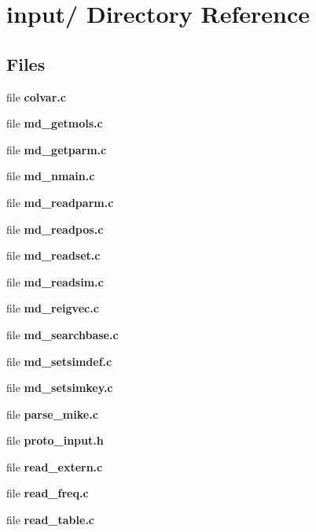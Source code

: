 \section{input/ Directory Reference}
\label{dir_ced1cca01981c350a62d28788f1e9798}
\subsection*{Files}
\begin{CompactItemize}
\item 
file {\bf colvar.c}
\item 
file {\bf md\_\-getmols.c}
\item 
file {\bf md\_\-getparm.c}
\item 
file {\bf md\_\-nmain.c}
\item 
file {\bf md\_\-readparm.c}
\item 
file {\bf md\_\-readpos.c}
\item 
file {\bf md\_\-readset.c}
\item 
file {\bf md\_\-readsim.c}
\item 
file {\bf md\_\-reigvec.c}
\item 
file {\bf md\_\-searchbase.c}
\item 
file {\bf md\_\-setsimdef.c}
\item 
file {\bf md\_\-setsimkey.c}
\item 
file {\bf parse\_\-mike.c}
\item 
file {\bf proto\_\-input.h}
\item 
file {\bf read\_\-extern.c}
\item 
file {\bf read\_\-freq.c}
\item 
file {\bf read\_\-table.c}
\end{CompactItemize}
